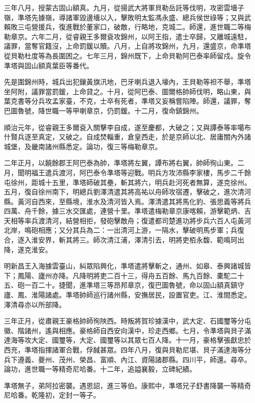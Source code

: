 \begin{pinyinscope}
三年八月，授蒙古固山額真。九月，從揚武大將軍貝勒岳託等伐明，攻密雲墻子嶺，準塔先據嶺，導諸軍毀邊墻以入，擊敗明太監馮永盛、總兵侯世祿等；又與武賴敗三屯營援兵，復進戰於董家口，破敵，行略地，克城二。師還，進世職二等梅勒章京。六年二月，從睿親王多爾袞攻錦州，以阿王指，遣士卒歸，又離城遠駐，議罪，當奪官籍沒，上命罰鍰以贖。八月，上自將攻錦州，九月，還盛京，命準塔從貝勒杜度等為長圍困之。七年三月，錦州既下，上命貝勒阿巴泰率師留戍。旋令準塔與固山額真葉臣等番代。

先是圍錦州時，城兵出犯鑲黃旗汛地，巴牙喇兵退入壕內，王貝勒等袒不舉，準塔坐阿附，議罪當罰鍰，上命貸之。十月，從阿巴泰、圖爾格帥師伐明，略山東，與葉克書等分兵攻孟家臺，不克，士卒有死者，準塔又妄稱嘗陷陣。師還，議罪，奪巴圖魯號，降世職一等甲喇章京，仍罰鍰。十二月，復命鎮錦州。

順治元年，從睿親王多爾袞入關擊李自成，遂至慶都，大破之；又與譚泰等率噶布什賢兵逐至真定，又破之。自成焚輜重，倉皇西走，於是京師以北、居庸關內外諸城堡，及畿南諸州縣悉定。論功，復三等梅勒章京。

二年正月，以饒餘郡王阿巴泰為帥，準塔將左翼，譚布將右翼，帥師徇山東。二月，聞明福王遣兵渡河，阿巴泰令準塔等迎戰。明兵方攻沛縣李家樓，馬步二千餘屯徐州，距城十五里，準塔師破其壘，斬其將六，明兵赴河死者無算，遂克徐州。五月，復自徐州南下，明總兵劉澤清遣其將高祐以舟師攻宿遷，擊破之，進次清河縣。黃河自西來，至縣境，淮水及清河皆入焉。澤清遣其將馬化豹、張思義等將兵四萬、舟千餘，據三水交匯處，連營十里。準塔遣梅勒章京康喀賴，游擊範炳、吉天相等率兵渡清河，結營相拒，發砲擊敵舟；復遣都司楚進功將步兵六百人屯黃河北岸，鳴砲相應；又分其兵為二：一出清河上游，一隔水，擊破明馬步軍；兵復合，逐入淮安界，斬其將三。師次清江浦，澤清引去，明將吏栢永馥、範鳴珂出降，遂克淮安。

明新昌王入海據雲臺山，糾眾陷興化，準塔遣將擊斬之，通州、如皋、泰興諸城皆下；鳳陽、廬州亦降。凡降明將吏二百十三，得舟五百餘、馬九百餘、橐駝二十五、砲一百二十。捷聞，進準塔三等昂邦章京，復巴圖魯號，命以固山額真鎮守廬、鳳、淮陽諸處。準塔帥師巡行諸州縣，安撫居民，設置官吏。江、淮間悉定。澤清尋亦以所部降。

三年正月，從肅親王豪格帥師徇陜西。時叛將賀珍據漢中，武大定、石國璽等分屯徽、階諸州，遙與相應。豪格師自西安向漢中，珍走西鄉。七月，令準塔與貝子滿達海等攻大定、國璽等，大定、國璽等以其眾七百人降。十一月，豪格擊張獻忠於西充，準塔指揮諸軍合戰，俘馘甚眾。四年八月，復與貝勒尼堪、貝子滿達海等分兵下遵義、夔州、茂州、榮昌、富順、內江、資陽諸郡縣。四川平，師還。尋卒。論功，進世職一等精奇尼哈番。十二年，追謚襄毅，立碑紀績。

準塔無子，弟阿拉密襲。遇恩詔，進三等伯。康熙中，準塔兄子舒書降襲一等精奇尼哈番。乾隆初，定封一等子。


\end{pinyinscope}
